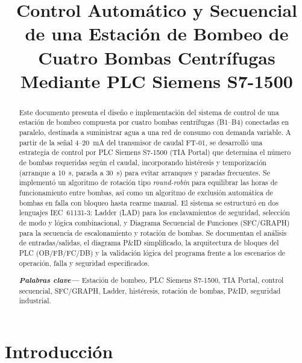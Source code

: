 \documentclass[conference]{IEEEtran}
\begin{document}
\title{Control Automático y Secuencial de una Estación de Bombeo de Cuatro Bombas Centrífugas Mediante PLC Siemens S7-1500}

\author{
}

\maketitle

\begin{abstract}
Este documento presenta el diseño e implementación del sistema de control de una estación de bombeo compuesta por cuatro bombas centrífugas (B1--B4) conectadas en paralelo, destinada a suministrar agua a una red de consumo con demanda variable. A partir de la señal 4--20~mA del transmisor de caudal FT-01, se desarrolló una estrategia de control por PLC Siemens S7-1500 (TIA Portal) que determina el número de bombas requeridas según el caudal, incorporando histéresis y temporización (arranque a 10~s, parada a 30~s) para evitar arranques y paradas frecuentes. Se implementó un algoritmo de rotación tipo \emph{round-robin} para equilibrar las horas de funcionamiento entre bombas, así como un algoritmo de exclusión automática de bombas en falla con bloqueo hasta rearme manual. El sistema se estructuró en dos lenguajes IEC~61131-3: Ladder (LAD) para los enclavamientos de seguridad, selección de modo y lógica combinacional, y Diagrama Secuencial de Funciones (SFC/GRAPH) para la secuencia de escalonamiento y rotación de bombas. Se documentan el análisis de entradas/salidas, el diagrama P\&ID simplificado, la arquitectura de bloques del PLC (OB/FB/FC/DB) y la validación lógica del programa frente a los escenarios de operación, falla y seguridad especificados.

\vspace{1em}
\noindent \textbf{\textit{Palabras clave---}} Estación de bombeo, PLC Siemens S7-1500, TIA Portal, control secuencial, SFC/GRAPH, Ladder, histéresis, rotación de bombas, P\&ID, seguridad industrial.
\end{abstract}

\section{Introducción}
\end{document}
